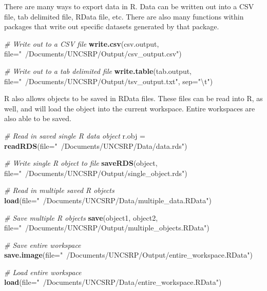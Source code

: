 \documentclass[
]{book}
\newenvironment{Shaded}{\begin{snugshade}}{\end{snugshade}}
\newcommand{\CharTok}[1]{\textcolor[rgb]{0.31,0.60,0.02}{#1}}
\newcommand{\CommentTok}[1]{\textcolor[rgb]{0.56,0.35,0.01}{\textit{#1}}}
\newcommand{\DataTypeTok}[1]{\textcolor[rgb]{0.13,0.29,0.53}{#1}}
\newcommand{\KeywordTok}[1]{\textcolor[rgb]{0.13,0.29,0.53}{\textbf{#1}}}
\newcommand{\NormalTok}[1]{#1}
\newcommand{\StringTok}[1]{\textcolor[rgb]{0.31,0.60,0.02}{#1}}
\begin{document}
There are many ways to export data in R. Data can be written out into a CSV file, tab delimited file, RData file, etc. There are also many functions within packages that write out specific datasets generated by that package.

\begin{Shaded}
\begin{Highlighting}[]
\CommentTok{# Write out to a CSV file}
\KeywordTok{write.csv}\NormalTok{(csv.output, }\DataTypeTok{file=}\StringTok{"~/Documents/UNCSRP/Output/csv_output.csv"}\NormalTok{)}

\CommentTok{# Write out to a tab delimited file}
\KeywordTok{write.table}\NormalTok{(tab.output, }\DataTypeTok{file=}\StringTok{"~/Documents/UNCSRP/Output/tsv_output.txt"}\NormalTok{, }\DataTypeTok{sep=}\StringTok{"}\CharTok{\textbackslash{}t}\StringTok{"}\NormalTok{)}
\end{Highlighting}
\end{Shaded}

R also allows objects to be saved in RData files. These files can be read into R, as well, and will load the object into the current workspace. Entire workspaces are also able to be saved.

\begin{Shaded}
\begin{Highlighting}[]
\CommentTok{# Read in saved single R data object}
\NormalTok{r.obj =}\StringTok{ }\KeywordTok{readRDS}\NormalTok{(}\DataTypeTok{file=}\StringTok{"~/Documents/UNCSRP/Data/data.rds"}\NormalTok{)}

\CommentTok{# Write single R object to file}
\KeywordTok{saveRDS}\NormalTok{(object, }\DataTypeTok{file=}\StringTok{"~/Documents/UNCSRP/Output/single_object.rds"}\NormalTok{)}

\CommentTok{# Read in multiple saved R objects}
\KeywordTok{load}\NormalTok{(}\DataTypeTok{file=}\StringTok{"~/Documents/UNCSRP/Data/multiple_data.RData"}\NormalTok{)}

\CommentTok{# Save multiple R objects}
\KeywordTok{save}\NormalTok{(object1, object2, }\DataTypeTok{file=}\StringTok{"~/Documents/UNCSRP/Output/multiple_objects.RData"}\NormalTok{)}

\CommentTok{# Save entire workspace}
\KeywordTok{save.image}\NormalTok{(}\DataTypeTok{file=}\StringTok{"~/Documents/UNCSRP/Output/entire_workspace.RData"}\NormalTok{)}

\CommentTok{# Load entire workspace}
\KeywordTok{load}\NormalTok{(}\DataTypeTok{file=}\StringTok{"~/Documents/UNCSRP/Data/entire_workspace.RData"}\NormalTok{)}
\end{Highlighting}
\end{Shaded}
\end{document}
